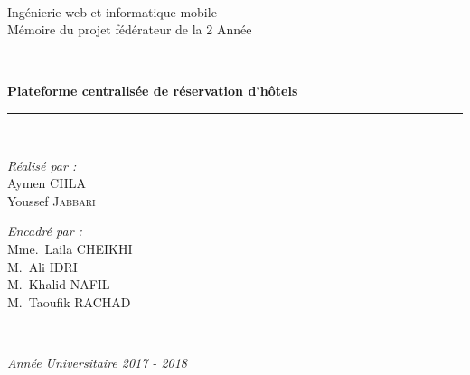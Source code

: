 \documentclass[12pt,a4paper]{report}
\begin{document}
\begin{titlepage}
\begin{center}
\begin{minipage}{0.4\textwidth}
		\end{minipage}\\[3cm]



		{\normalsize Ingénierie web et informatique mobile }\\[0.5cm]

		{\normalsize M\'emoire du projet fédérateur de la  2 Ann\'ee}\\[0.5cm]

		\rule{\linewidth}{0.5mm} \\[0.4cm]
		{ \large \bfseries Plateforme centralisée de réservation d'hôtels \\[0.4cm] }
		\rule{\linewidth}{0.5mm} \\[3cm]

		\noindent
		\begin{minipage}{0.4\textwidth}
		  \begin{flushleft} \small
		    \emph{Réalisé par :}\\
		
		      Aymen \textsc{CHLA}\\
		      Youssef \textsc{Jabbari}\\
		  \end{flushleft}
		\end{minipage}%
		\begin{minipage}{0.4\textwidth}
		  \begin{flushright} \small
		    \emph{Encadré par :} \\
		    Mme.~Laila \textsc{CHEIKHI}\\
		    M.~Ali \textsc{IDRI}\\  
		    M.~Khalid \textsc{NAFIL}\\ 
		    M.~Taoufik \textsc{RACHAD}\\  
		  \end{flushright}
		\end{minipage}\\[4cm]

		\vfill

		{\large \slshape Année Universitaire 2017 - 2018}

		\end{center}
	\end{titlepage}
	
\end{document}
